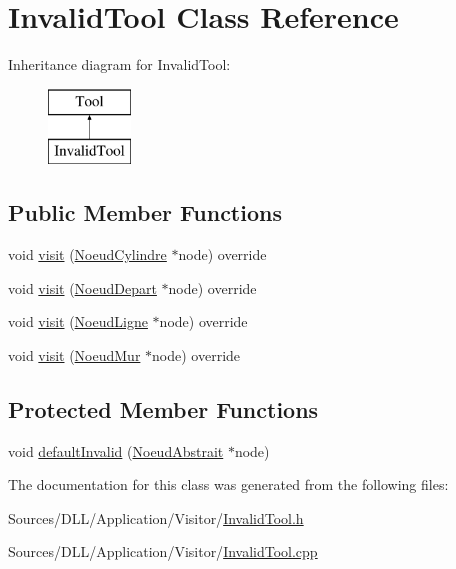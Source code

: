 \hypertarget{class_invalid_tool}{}\section{Invalid\+Tool Class Reference}
\label{class_invalid_tool}
Inheritance diagram for Invalid\+Tool\+:\begin{figure}[H]
\begin{center}
\leavevmode
\includegraphics[height=2.000000cm]{class_invalid_tool}
\end{center}
\end{figure}
\subsection*{Public Member Functions}
\begin{DoxyCompactItemize}
\item 
void \hyperlink{group__inf2990_ga55674ebdcf4c31ced5df732e2424d282}{visit} (\hyperlink{class_noeud_cylindre}{Noeud\+Cylindre} $\ast$node) override
\item 
void \hyperlink{group__inf2990_gabbc70a0da4b0aadac5a37f1fce30cb7a}{visit} (\hyperlink{class_noeud_depart}{Noeud\+Depart} $\ast$node) override
\item 
void \hyperlink{group__inf2990_gabc3528c6c0b4d009a2a0fa51493e517a}{visit} (\hyperlink{class_noeud_ligne}{Noeud\+Ligne} $\ast$node) override
\item 
void \hyperlink{group__inf2990_gab69a438cb8d2abff211cd450c9f946f5}{visit} (\hyperlink{class_noeud_mur}{Noeud\+Mur} $\ast$node) override
\end{DoxyCompactItemize}
\subsection*{Protected Member Functions}
\begin{DoxyCompactItemize}
\item 
void \hyperlink{group__inf2990_gafb96baa12cb0df8c48c84dd12badd757}{default\+Invalid} (\hyperlink{class_noeud_abstrait}{Noeud\+Abstrait} $\ast$node)
\end{DoxyCompactItemize}


The documentation for this class was generated from the following files\+:\begin{DoxyCompactItemize}
\item 
Sources/\+D\+L\+L/\+Application/\+Visitor/\hyperlink{_invalid_tool_8h}{Invalid\+Tool.\+h}\item 
Sources/\+D\+L\+L/\+Application/\+Visitor/\hyperlink{_invalid_tool_8cpp}{Invalid\+Tool.\+cpp}\end{DoxyCompactItemize}
